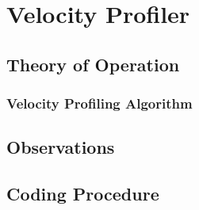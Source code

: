 \section{Velocity Profiler}

\subsection{Theory of Operation}

\subsubsection{Velocity Profiling Algorithm}

\subsection{Observations}

\subsection{Coding Procedure}